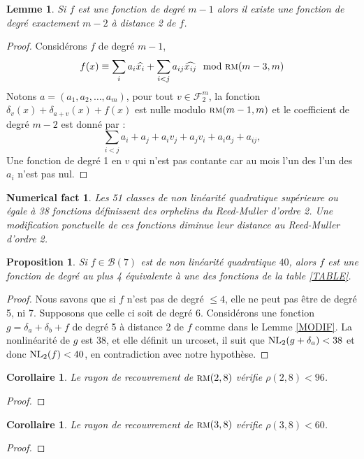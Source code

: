 \documentclass[11pt,a4paper]{article}
\def\NL(#1,#2){ {\rm NL}_{#1}(#2) }
\def\rmc(#1,#2){ \textsc {rm}(#1,#2) }
\def\boole(#1){\mathcal{B}(#1)}
\def\fd(#1){\mathcal{F}_2^{#1}}
\theoremstyle{plain}
\newtheorem{proposition}[theorem]{Proposition}
\newtheorem{result}[theorem]{Numerical fact}
\newtheorem{lemma}[theorem]{Lemme}
\newtheorem{coro}[theorem]{Corollaire}
\theoremstyle{definition}
\theoremstyle{remark}
\begin{document}
\begin{lemma}
	Si $f$ est une fonction de degré $m-1$ alors il
	existe une fonction de degré exactement $m-2$ à
	distance 2 de $f$.  
\end{lemma}
\begin{proof}
Considérons $f$ de degré $m-1$, 
$$
f(x) \equiv \sum_{i} a_i \widehat{ x_i}  + \sum_{i<j} a_{ij} \widehat{x_{ij}}\mod {\rmc(m-3,m)} 
$$
Notons $a=(a_1,a_2,\ldots,a_m)$, pour tout $v\in\fd(m)$, 
la fonction $\delta_v( x ) + \delta_{a+v}( x ) + f( x )$ est nulle modulo $\rmc(m-1,m)$ 
et le coefficient  de degré $m-2$ est donné par :
$$
	 \sum_{i<j} a_i + a_j + a_i v_j + a_j v_i + a_i a_j  + a_{ij},
$$
Une fonction de degré 1 en $v$ qui n'est pas contante  
car au mois l'un des l'un des $a_i$ n'est pas nul.
\end{proof}

\begin{result}
Les 51 classes de non linéarité quadratique supérieure ou égale
à 38 fonctions définissent des orphelins du Reed-Muller d'ordre 2.
	Une modification ponctuelle de ces fonctions diminue 
	leur distance au Reed-Muller d'ordre 2.
\end{result}


\begin{proposition}
\label{prop:complet}
Si $f\in\boole(7)$ est de non linéarité quadratique $40$, 
alors $f$ est une fonction de degré au plus 4 équivalente 
à une des fonctions de la table \ref{TABLE}.
\end{proposition}
\begin{proof}
Nous savons que si $f$ n'est pas de degré $\leq 4$, elle ne peut pas être de degré 5, ni 7. 
Supposons que celle ci soit de degré 6.  Considérons une fonction $g=\delta_a+\delta_b+f$ 
de degré 5 à distance 2 de $f$ comme dans le Lemme \ref{MODIF}. La nonlinéarité de $g$ est
38, et elle définit un urcoset, il suit que $ \NL(2, g + \delta_a)  < 38$ 
et donc $\NL(2,f) < 40$, en contradiction avec notre hypothèse.
\end{proof}


\begin{coro}
	Le rayon de recouvrement de $\rmc(2, 8)$ vérifie $\rho(2,8) < 96$.
\end{coro}
\begin{proof}
\end{proof}


\begin{coro}
	Le rayon de recouvrement de $\rmc(3, 8)$ vérifie $\rho(3,8) < 60$.
\end{coro}
\begin{proof}
\end{proof}
\end{document}
